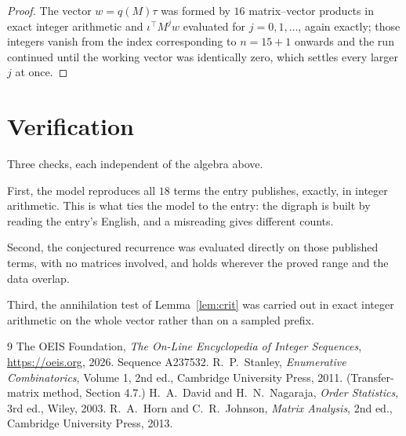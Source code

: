 \documentclass[11pt,a4paper]{article}
\theoremstyle{plain}
\theoremstyle{definition}
\begin{document}
\begin{proof}
The vector $w=q(M)\tau$ was formed by $16$ matrix--vector products in exact integer
arithmetic and $\iota^{\!\top}M^{j}w$ evaluated for $j=0,1,\dots$, again exactly; those
integers vanish from the index corresponding to $n=15+1$ onwards and the run continued
until the working vector was identically zero, which settles every larger $j$ at once.
\end{proof}

\section{Verification}

Three checks, each independent of the algebra above.

First, the model reproduces all $18$ terms the entry publishes, exactly, in integer
arithmetic. This is what ties the model to the entry: the digraph is built by reading the
entry's English, and a misreading gives different counts.

Second, the conjectured recurrence was evaluated directly on those published terms, with no
matrices involved, and holds wherever the proved range and the data overlap.

Third, the annihilation test of Lemma~\ref{lem:crit} was carried out in exact integer
arithmetic on the whole vector rather than on a sampled prefix.

\begin{thebibliography}{9}
 The OEIS Foundation, \emph{The On-Line Encyclopedia of Integer
Sequences}, \url{https://oeis.org}, 2026. Sequence A237532.
 R.~P.~Stanley, \emph{Enumerative Combinatorics}, Volume 1, 2nd ed.,
Cambridge University Press, 2011. (Transfer-matrix method, Section 4.7.)
 H.~A.~David and H.~N.~Nagaraja, \emph{Order Statistics}, 3rd ed., Wiley,
2003.
 R.~A.~Horn and C.~R.~Johnson, \emph{Matrix Analysis}, 2nd ed., Cambridge
University Press, 2013.
\end{thebibliography}
\end{document}
